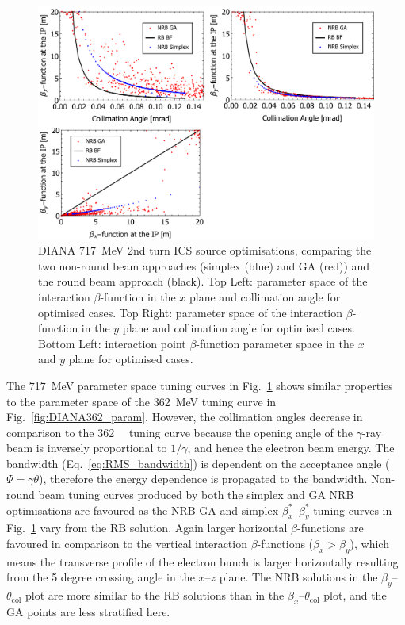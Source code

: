 \documentclass[../main.tex]{subfiles}
\begin{document}
\begin{figure}[!h]
\centering
\includegraphics[width=\textwidth]{Figures/DIANA_Inverse_Compton_Source_Design/DIANA717param.pdf}
\caption{DIANA 717~\si{\mega\electronvolt} 2nd turn ICS source optimisations, comparing the two non-round beam approaches (simplex (blue) and GA (red)) and the round beam approach (black). Top Left: parameter space of the interaction $\beta$-function in the $x$ plane and collimation angle for optimised cases. Top Right: parameter space of the interaction $\beta$-function in the $y$ plane and collimation angle for optimised cases. Bottom Left: interaction point $\beta$-function parameter space in the $x$ and $y$ plane for optimised cases. }
\label{fig:DIANA717_param}
\end{figure}

The 717~\si{\mega\electronvolt} parameter space tuning curves in Fig.~\ref{fig:DIANA717_param} shows similar properties to the parameter space of the 362~\si{\mega\electronvolt} tuning curve in Fig.~\ref{fig:DIANA362_param}. However, the collimation angles decrease in comparison to the 362~\si{\mega\lectronvolt} tuning curve because the opening angle of the $\gamma$-ray beam is inversely proportional to $1/\gamma$, and hence the electron beam energy. The bandwidth (Eq.~\ref{eq:RMS_bandwidth}) is dependent on the acceptance angle ($\Psi=\gamma\theta$), therefore the energy dependence is propagated to the bandwidth. Non-round beam tuning curves produced by both the simplex and GA NRB optimisations are favoured as the NRB GA and simplex $\beta_{x}^{*}$--$\beta_{y}^{*}$ tuning curves in Fig.~\ref{fig:DIANA717_param} vary from the RB solution. Again larger horizontal $\beta$-functions are favoured in comparison to the vertical interaction $\beta$-functions ($\beta_{x}>\beta_{y}$), which means the transverse profile of the electron bunch is larger horizontally resulting from the 5 degree crossing angle in the $x$--$z$ plane. The NRB solutions in the $\beta_{y}$--$\theta_{\mathrm{col}}$ plot are more similar to the RB solutions than in the $\beta_{x}$--$\theta_{\mathrm{col}}$ plot, and the GA points are less stratified here.    
\end{document}
